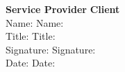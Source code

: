 \documentclass[12pt]{article}
\begin{document}
\noindent
\textbf{Service Provider} \hfill \textbf{Client} \\
Name: \underline{\hspace{5cm}} \hfill Name: \underline{\hspace{5cm}} \\
Title: \underline{\hspace{5cm}} \hfill Title: \underline{\hspace{5cm}} \\
Signature: \underline{\hspace{5cm}} \hfill Signature: \underline{\hspace{5cm}} \\
Date: \underline{\hspace{5cm}} \hfill Date: \underline{\hspace{5cm}}
\end{document}
